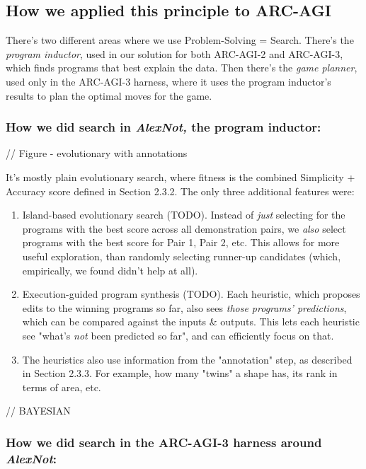 \documentclass{article}
\begin{document}
\subsection{How we applied this principle to ARC-AGI }

There's two different areas where we use Problem-Solving = Search. There's the \textit{program inductor}, used in our solution for both ARC-AGI-2 and ARC-AGI-3, which finds programs that best explain the data. Then there's the \textit{game planner}, used only in the ARC-AGI-3 harness, where it uses the program inductor's results to plan the optimal moves for the game.

\subsubsection{How we did search in \textit{AlexNot,} the program inductor:}

// Figure - evolutionary with annotations

It's mostly plain evolutionary search, where fitness is the combined Simplicity + Accuracy score defined in Section 2.3.2. The only three additional features were:

\begin{enumerate}
    \item Island-based evolutionary search (TODO). Instead of \textit{just} selecting for the programs with the best score across all demonstration pairs, we \textit{also} select programs with the best score for Pair 1, Pair 2, etc. This allows for more useful exploration, than randomly selecting runner-up candidates (which, empirically, we found didn't help at all).
    \item Execution-guided program synthesis (TODO). Each heuristic, which proposes edits to the winning programs so far, also sees \textit{those programs' predictions}, which can be compared against the inputs \& outputs. This lets each heuristic see "what's \textit{not} been predicted so far", and can efficiently focus on that.
    \item The heuristics also use information from the "annotation" step, as described in Section 2.3.3. For example, how many "twins" a shape has, its rank in terms of area, etc.
\end{enumerate}

// BAYESIAN

\subsubsection{How we did search in the ARC-AGI-3 harness around \textit{AlexNot}:}
\end{document}
